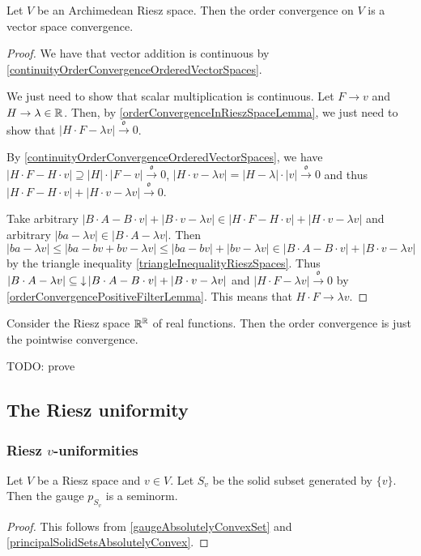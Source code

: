 \begin{proposition}
Let $V$ be an Archimedean Riesz space. Then the order convergence on $V$ is a vector space convergence.
\end{proposition}
\begin{proof}
We have that vector addition is continuous by \ref{continuityOrderConvergenceOrderedVectorSpaces}.

We just need to show that scalar multiplication is continuous. Let $F\to v$ and $H \to \lambda\in \mathbb{R}$. Then, by \ref{orderConvergenceInRieszSpaceLemma}, we just need to show that $|H\cdot F - \lambda v|\overset{\mathfrak{o}}{\longrightarrow} 0$.

By \ref{continuityOrderConvergenceOrderedVectorSpaces}, we have $|H\cdot F - H\cdot v| \supseteq |H|\cdot |F-v| \overset{\mathfrak{o}}{\longrightarrow} 0$, $|H\cdot v - \lambda v| = |H-\lambda|\cdot |v| \overset{\mathfrak{o}}{\longrightarrow} 0$ and thus $|H\cdot F - H\cdot v| + |H\cdot v - \lambda v| \overset{\mathfrak{o}}{\longrightarrow} 0$.

Take arbitrary $|B\cdot A - B\cdot v| + |B\cdot v - \lambda v| \in |H\cdot F - H\cdot v| + |H\cdot v - \lambda v|$ and arbitrary $|ba - \lambda v| \in |B\cdot A - \lambda v|$. Then
\[ |ba - \lambda v| \leq |ba - bv + bv - \lambda v| \leq |ba - bv| + |bv - \lambda v| \in |B\cdot A - B\cdot v| + |B\cdot v - \lambda v| \]
by the triangle inequality \ref{triangleInequalityRieszSpaces}. Thus $|B\cdot A - \lambda v| \subseteq \operatorname{\downarrow} |B\cdot A - B\cdot v| + |B\cdot v - \lambda v|$ and $|H\cdot F - \lambda v| \overset{\mathfrak{o}}{\longrightarrow} 0$ by \ref{orderConvergencePositiveFilterLemma}. This means that $H\cdot F \to \lambda v$.
\end{proof}

\begin{example}
Consider the Riesz space $\mathbb{R}^{\mathbb{R}}$ of real functions. Then the order convergence is just the pointwise convergence.

TODO: prove
\end{example}


\subsection{The Riesz uniformity}
\subsubsection{Riesz $v$-uniformities}
\begin{lemma}
Let $V$ be a Riesz space and $v\in V$. Let $S_v$ be the solid subset generated by $\{v\}$. Then the gauge $p_{S_v}$ is a seminorm.
\end{lemma}
\begin{proof}
This follows from \ref{gaugeAbsolutelyConvexSet} and \ref{principalSolidSetsAbsolutelyConvex}.
\end{proof}

